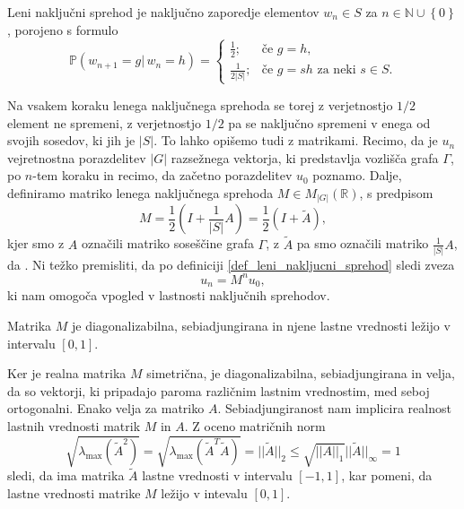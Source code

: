 \begin{definicija}
\label{def_leni_nakljucni_sprehod}
    Leni naključni sprehod je naključno zaporedje elementov $w_n \in S$ za $n \in \mathbb{N} \cup \left\{ 0\right\} $, porojeno s formulo \begin{equation*}
        \mathbb{P}(w_{n+1} = g   \vert \,  w_n = h) = \begin{cases}
            \frac{1}{2}; & \text{če }  g = h, \\
            \frac{1}{2 \lvert S \rvert }; & \text{če } g = sh \text{ za neki } s \in S.
        \end{cases}
    \end{equation*}  
\end{definicija}
Na vsakem koraku lenega naključnega sprehoda se torej z verjetnostjo $1 / 2$ element ne spremeni, z verjetnostjo $1 / 2$ pa se naključno spremeni v enega od svojih sosedov, ki jih je $\lvert S \rvert$.
To lahko opišemo tudi z matrikami. Recimo, da je $u_n$ vejretnostna porazdelitev $\lvert G \rvert$ razsežnega vektorja, ki predstavlja vozlišča grafa $\Gamma$, po $n$-tem koraku in recimo, da začetno porazdelitev $u_0$ poznamo. Dalje, definiramo matriko lenega naključnega sprehoda $M \in M_{\lvert G \rvert }(\mathbb{R})$, s predpisom    
\begin{equation*}
M = \frac{1}{2} \left(I + \frac{1}{\lvert S \rvert } A \right) = \frac{1}{2} (I + \tilde{A}),
\end{equation*}  
kjer smo z $A$ označili matriko soseščine grafa $\Gamma$, z $\tilde{A}$ pa smo označili matriko $\frac{1}{\lvert S \rvert} A$, da . Ni težko premisliti, da po definiciji \ref{def_leni_nakljucni_sprehod} sledi zveza 
\begin{equation*}
u_n = M^{n} u_0,
\end{equation*}  
ki nam omogoča vpogled v lastnosti naključnih sprehodov. 

\begin{lema}
\label{lem_M_je_sebiadjungirana}
Matrika $M$ je diagonalizabilna, sebiadjungirana in njene lastne vrednosti ležijo v intervalu $[0, 1]$.
\end{lema}
\begin{dokaz}
Ker je realna matrika $M$ simetrična, je diagonalizabilna, sebiadjungirana in velja, da so vektorji, ki pripadajo paroma različnim lastnim vrednostim, med seboj ortogonalni. Enako velja za matriko $A$. Sebiadjungiranost nam implicira realnost lastnih vrednosti matrik $M$ in $A$.
Z oceno matričnih norm \begin{equation*}
    \sqrt{ \lambda_{\max} (\tilde{A}^2)} = \sqrt{\lambda_{\max} (\tilde{A}^{T} \tilde{A} )}  = \lvert\lvert \tilde{A} \rvert\rvert_2 \le \sqrt{\lvert\lvert A \rvert\rvert_1}  \lvert\lvert \tilde{A} \rvert\rvert_{\infty} = 1 
\end{equation*}  
sledi, da ima matrika $\tilde{A}$ lastne vrednosti v intervalu $[-1 ,1]$, kar pomeni, da lastne vrednosti matrike $M$ ležijo v intevalu $[0, 1]$. 
\end{dokaz}

